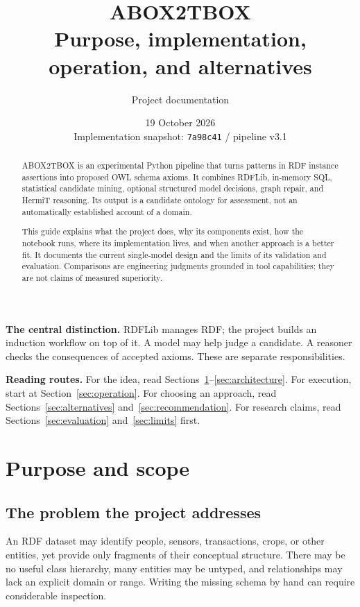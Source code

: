 \documentclass[11pt,a4paper]{article}
\title{ABOX2TBOX\\[5pt]\large Purpose, implementation, operation, and alternatives}
\author{Project documentation}
\date{19 October 2026\\[3pt]\small Implementation snapshot: \texttt{7a98c41} / pipeline v3.1}
\begin{document}
\maketitle
\thispagestyle{plain}

\begin{abstract}
ABOX2TBOX is an experimental Python pipeline that turns patterns in RDF instance
assertions into proposed OWL schema axioms. It combines RDFLib, in-memory SQL,
statistical candidate mining, optional structured model decisions, graph repair,
and HermiT reasoning. Its output is a candidate ontology for assessment, not an
automatically established account of a domain.

This guide explains what the project does, why its components exist, how the
notebook runs, where its implementation lives, and when another approach is a
better fit. It documents the current single-model design and the limits of its
validation and evaluation. Comparisons are engineering judgments grounded in
tool capabilities; they are not claims of measured superiority.
\end{abstract}

\textbf{The central distinction.} RDFLib manages RDF; the project builds an
induction workflow on top of it. A model may help judge a candidate. A reasoner
checks the consequences of accepted axioms. These are separate responsibilities.

\textbf{Reading routes.} For the idea, read Sections~\ref{sec:purpose}--\ref{sec:architecture}.
For execution, start at Section~\ref{sec:operation}. For choosing an approach,
read Sections~\ref{sec:alternatives} and~\ref{sec:recommendation}. For research
claims, read Sections~\ref{sec:evaluation} and~\ref{sec:limits} first.

\newpage
\tableofcontents
\newpage

\section{Purpose and scope}\label{sec:purpose}

\subsection{The problem the project addresses}
An RDF dataset may identify people, sensors, transactions, crops, or other
entities, yet provide only fragments of their conceptual structure. There may be
no useful class hierarchy, many entities may be untyped, and relationships may
lack an explicit domain or range. Writing the missing schema by hand can require
considerable inspection.
\end{document}
